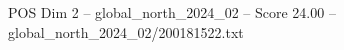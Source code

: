 \begin{textsample}{POS Dim 2 – global\_north\_2024\_02 – Score 24.00 – global\_north\_2024\_02/200181522.txt}
\end{textsample}
